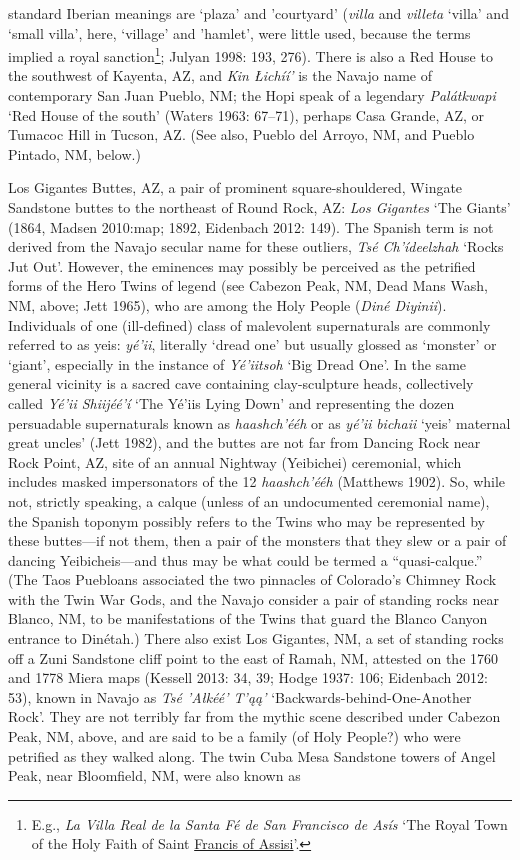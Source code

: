 standard Iberian meanings are ‘plaza’ and ’courtyard’ (\textit{villa} and \textit{villeta} ‘villa’ and ‘small villa’, here, ‘village’ and ’hamlet’, were little used, because the terms implied a royal sanction\footnote{E.g., \textit{La Villa Real de la Santa Fé de San Francisco de Asís} ‘The Royal Town of the Holy Faith of Saint \href{https://en.wikipedia.org/wiki/Francis_of_Assisi}{Francis of Assisi}’.}; Julyan 1998: 193, 276).  There is also a Red House to the southwest of Kayenta, AZ, and \textit{Kin Łichíí' }is the Navajo name of contemporary San Juan Pueblo, NM; the Hopi speak of a legendary \textit{Palátkwapi} ‘Red House of the south’ (Waters 1963: 67–71), perhaps Casa Grande, AZ, or Tumacoc Hill in Tucson, AZ.  (See also, Pueblo del Arroyo, NM, and Pueblo Pintado, NM, below.)

Los Gigantes Buttes, AZ, a pair of prominent square-shouldered, Wingate Sandstone buttes to the northeast of Round Rock, AZ:  \textit{Los Gigantes} ‘The Giants’ (1864, Madsen 2010:map; 1892, Eidenbach 2012: 149).  The Spanish term is not derived from the Navajo secular name for these outliers, \textit{Tsé Ch’ídeelzhah} ‘Rocks Jut Out’.  However, the eminences may possibly be perceived as the petrified forms of the Hero Twins of legend (see Cabezon Peak, NM, Dead Mans Wash, NM, above; Jett 1965), who are among the Holy People (\textit{Diné Diyinii}).  Individuals of one (ill-defined) class of malevolent supernaturals are commonly referred to as yeis: \textit{yé’ii}, literally ‘dread one’ but usually glossed as ‘monster’ or ‘giant’, especially in the instance of \textit{Yé’iitsoh} ‘Big Dread One’.  In the same general vicinity is a sacred cave containing clay-sculpture heads, collectively called \textit{Yé’ii Shiijéé’í  }‘The Yé’iis Lying Down’ and representing the dozen persuadable supernaturals known as \textit{haashch’ééh} or as \textit{yé’ii} \textit{bichaii} ‘yeis’ maternal great uncles’ (Jett 1982), and the buttes are not far from Dancing Rock near Rock Point, AZ, site of an annual Nightway (Yeibichei) ceremonial, which includes masked impersonators of the 12 \textit{haashch’ééh} (Matthews 1902).  So, while not, strictly speaking, a calque (unless of an undocumented ceremonial name), the Spanish toponym possibly refers to the Twins who may be represented by these buttes—if not them, then a pair of the monsters that they slew or a pair of dancing Yeibicheis—and thus may be what could be termed a “quasi-calque.”  (The Taos Puebloans associated the two pinnacles of Colorado’s Chimney Rock with the Twin War Gods, and the Navajo consider a pair of standing rocks near Blanco, NM, to be manifestations of the Twins that guard the Blanco Canyon entrance to Dinétah.)  There also exist Los Gigantes, NM, a set of standing rocks off a Zuni Sandstone cliff point to the east of Ramah, NM, attested on the 1760 and 1778 Miera maps (Kessell 2013: 34, 39; Hodge 1937: 106; Eidenbach 2012: 53), known in Navajo as \textit{Tsé ’Ałkéé’ T’ąą’} ‘Backwards-behind-One-Another Rock’.  They are not terribly far from the mythic scene described under Cabezon Peak, NM, above, and are said to be a family (of Holy People?) who were petrified as they walked along.  The twin Cuba Mesa Sandstone towers of Angel Peak, near Bloomfield, NM, were also known as 